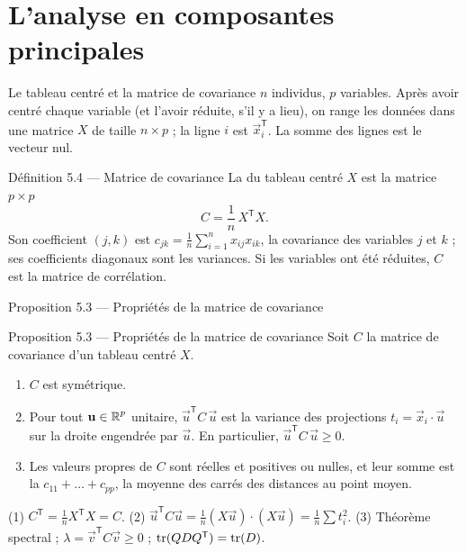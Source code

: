 \section{L'analyse en composantes principales}

\begin{frame}{Le tableau centré et la matrice de covariance}
  \small $n$ individus, $p$ variables. Après avoir centré chaque variable
  (et l'avoir réduite, s'il y a lieu), on range les données dans une
  matrice $X$ de taille $n\times p$ ; la ligne $i$ est
  $\vec x_i^{\mathsf T}$. La somme des lignes est le vecteur nul.
  \begin{Enonce}{Définition 5.4 --- Matrice de covariance}
    La  du tableau centré $X$ est la matrice
    $p\times p$
    \[
      C=\frac1n\,X^{\mathsf T}X .
    \]
    Son coefficient $(j,k)$ est $c_{jk}=\frac1n\sum_{i=1}^n x_{ij}x_{ik}$, la
    covariance des variables $j$ et $k$ ; ses coefficients diagonaux sont
    les variances. Si les variables ont été réduites, $C$ est la matrice de
    corrélation.
  \end{Enonce}
\end{frame}

\begin{frame}{Proposition 5.3 --- Propriétés de la matrice de covariance}
  \begin{Enonce}{Proposition 5.3 --- Propriétés de la matrice de covariance}
    Soit $C$ la matrice de covariance d'un tableau centré $X$.
    \begin{enumerate}
      \item $C$ est symétrique.
      \item Pour tout $\mathbf{u}\in\operatorname{\mathbb{R}}^p$ unitaire, $\vec u^{\mathsf T}C\,\vec u$
        est la variance des projections $t_i=\vec x_i\cdot\vec u$ sur la
        droite engendrée par $\vec u$. En particulier,
        $\vec u^{\mathsf T}C\,\vec u\geq0$.
      \item Les valeurs propres de $C$ sont réelles et positives ou nulles,
        et leur somme est la 
        $c_{11}+\dots+c_{pp}$, la moyenne des carrés des distances au point
        moyen.
    \end{enumerate}
  \end{Enonce}
  \begin{AuTableau}
    \footnotesize (1) $C^{\mathsf T}=\frac1nX^{\mathsf T}X=C$. (2)
    $\vec u^{\mathsf T}C\vec u=\frac1n(X\vec u)\cdot(X\vec u)=\frac1n\sum t_i^2$.
    (3) Théorème spectral ; $\lambda=\vec v^{\mathsf T}C\vec v\geq0$ ;
    $\operatorname{tr}(QDQ^{\mathsf T})=\operatorname{tr}(D)$.
  \end{AuTableau}
\end{frame}

